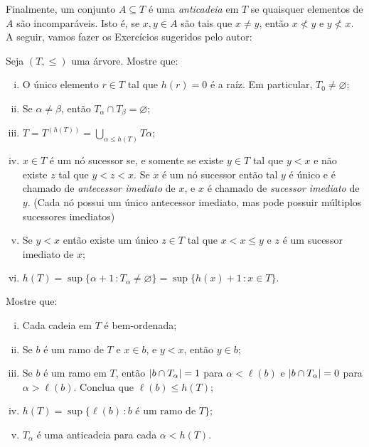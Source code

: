 \documentclass[a4paper]{article}
\begin{document}
Finalmente, um conjunto \(A\subseteq T\) é uma \emph{anticadeia} em \(T\) se
quaisquer elementos de \(A\) são incomparáveis. Isto é, se \(x,y\in A\) são tais
que \(x\not = y\), então \(x\not < y\) e \(y\not < x\). A seguir, vamos fazer os
Exercícios sugeridos pelo autor:
\begin{exercicio}
  Seja \((T,\leq)\) uma árvore. Mostre que:
  \begin{enumerate}[(i)]
  \item O único elemento \(r\in T\) tal que \(h(r)=0\) é a raíz. Em particular,
    \(T_0\not=\varnothing\);
  \item Se \(\alpha\not = \beta\), então \(T_\alpha\cap T_\beta =\varnothing\);
  \item \(T=T^{(h(T))}=\bigcup_{\alpha\leq h(T)}T\alpha\);
  \item \(x\in T\) é um nó sucessor se, e somente se existe \(y\in T\) tal que
    \(y < x\) e não existe \(z\) tal que \(y<z<x\). Se \(x\) é um nó sucessor
    então tal \(y\) é único e é chamado de \emph{antecessor imediato} de \(x\),
    e \(x\) é chamado de \emph{sucessor imediato} de \(y\). (Cada nó possui um
    único antecessor imediato, mas pode possuir múltiplos sucessores imediatos)
    \item Se \(y< x\) então existe um único \(z\in T\) tal que \(x< x\leq y\) e
      \(z\) é um sucessor imediato de \(x\);
    \item \(h(T)=\sup\{\alpha +1\,\colon
      T_\alpha\not=\varnothing\}=\sup\{h(x)+1\,\colon x\in T\}.\)
  \end{enumerate}

\end{exercicio}

  \begin{exercicio}
    Mostre que:
    \begin{enumerate}[(i)]
    \item Cada cadeia em \(T\) é bem-ordenada;
    \item Se \(b\) é um ramo de \(T\) e \(x\in b\), e \(y<x\), então \(y\in b\);
    \item Se \(b\) é um ramo em \(T\), então \(\vert b\cap T_\alpha \vert=1\) para
      \(\alpha <\ell (b)\) e \(\vert b\cap T_\alpha \vert=0\) para \(\alpha
      >\ell (b)\). Conclua que \(\ell (b)\leq h(T)\);
    \item \(h(T)=\sup\{\ell (b)\,\colon b \text{ é um ramo de } T\}\);
    \item \(T_\alpha\) é uma anticadeia para cada \(\alpha < h(T)\).
     \end{enumerate}
  \end{exercicio}


 
\end{document}
